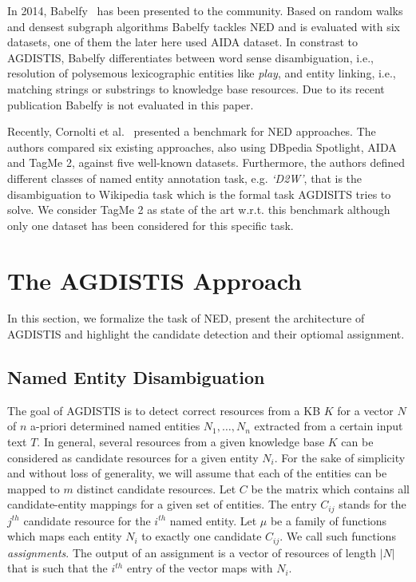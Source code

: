 In 2014, Babelfy~\cite{babelfy} has been presented to the community.
Based on random walks and densest subgraph algorithms Babelfy tackles \ac{NED} and is evaluated with six datasets, one of them the later here used AIDA dataset. 
In constrast to AGDISTIS, Babelfy differentiates between word sense disambiguation, i.e., resolution of polysemous lexicographic entities like \emph{play}, and entity linking, i.e., matching strings or substrings to knowledge base resources.
Due to its recent publication Babelfy is not evaluated in this paper.

Recently, Cornolti et al.~\cite{cornolti} presented a benchmark for \ac{NED} approaches.
The authors compared six existing approaches, also using DBpedia Spotlight, AIDA and TagMe 2, against five well-known datasets. %
Furthermore, the authors defined different classes of named entity annotation task, e.g. \emph{`D2W'}, that is the disambiguation to Wikipedia task which is the formal task AGDISITS tries to solve.
We consider TagMe 2 as state of the art w.r.t. this benchmark although only one dataset has been considered for this specific task.

\section{The AGDISTIS Approach} 
\label{sec:approach}

In this section, we formalize the task of \ac{NED}, present the architecture of AGDISTIS and highlight the candidate detection and their optiomal assignment. 

\subsection{Named Entity Disambiguation}
\label{sec:ned}

The goal of AGDISTIS is to detect correct resources from a \ac{KB} $K$ for a vector $N$ of $n$ a-priori determined named entities $N_1,\ldots,N_n$ extracted from a certain input text $T$.
In general, several resources from a given knowledge base $K$ can be considered as candidate resources for a given entity $N_i$.
For the sake of simplicity and without loss of generality, we will assume that each of the entities can be mapped to $m$ distinct candidate resources.
Let $C$ be the matrix which contains all candidate-entity mappings for a given set of entities.
The entry $C_{ij}$ stands for the $j^{th}$ candidate resource for the $i^{th}$ named entity. 
Let $\mu$ be a family of functions which maps each entity $N_i$ to exactly one candidate $C_{ij}$. 
We call such functions \emph{assignments}.
The output of an assignment is a vector of resources of length $|N|$ that is such that the $i^{th}$ entry of the vector maps with $N_i$.

